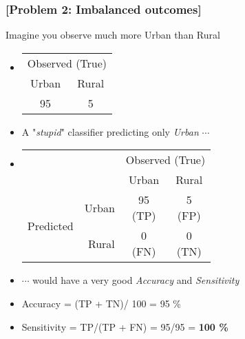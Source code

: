 \documentclass[xcolor=x11names,compress, aspectratio=169]{beamer}
\renewcommand{\(}{\begin{columns}}
\renewcommand{\)}{\end{columns}}
\newcommand{\<}[1]{\begin{column}{#1}}
\renewcommand{\>}{\end{column}}
\begin{document}
\begin{frame} %
\frametitle{\textcolor{brique}{[Problem 2: Imbalanced outcomes]}}
Imagine you observe much more Urban than Rural
\begin{itemize}[<+->]
 \item[]
    \begin{table}[]
    \begin{tabular}{|c|c|}

     \multicolumn{2}{c}{Observed (True)}                                                                                          \\
      Urban  &  Rural  \\  \hline
      95     & 5       \\  \hline
    \end{tabular}
    \end{table}
  \item A "\textit{stupid}" classifier predicting only \textit{Urban} $\cdots$
  \item[]
    \begin{table}[]
    \begin{tabular}{l r|c|c|}

                              & & \multicolumn{2}{c|}{Observed (True)}                                                                                          \\
                              & &    Urban  &  Rural  \\  \hline
    \multirow{2}{*}{Predicted}& Urban & \shortstack[c]{95 \\ \tiny{(TP)}}& \shortstack[c]{5 \\ \tiny{(FP)}} \\ \cline{2-4}
                              & Rural &  \shortstack[c]{0 \\ \tiny{(FN)}}& \shortstack[c]{0 \\ \tiny{(TN)}} \\ \hline
    \end{tabular}
    \end{table}
  \item[] $\cdots$ would have a very good \textit{Accuracy} and \textit{Sensitivity}
  \item[] Accuracy = (TP + TN)/ 100 = 95 \%
  \item[] Sensitivity = TP/(TP + FN) = 95/95 = \textbf{100 \%}
\end{itemize}
\end{frame}
\end{document}
